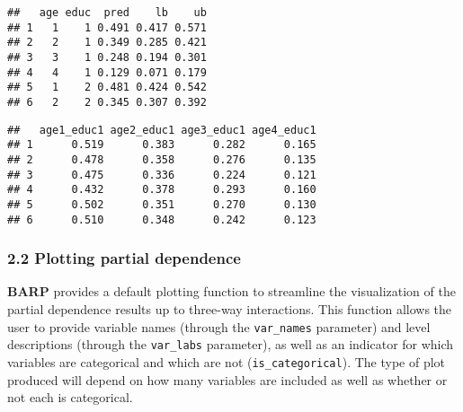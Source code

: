 \documentclass[]{article}
\newenvironment{Shaded}{\begin{snugshade}}{\end{snugshade}}
\newcommand{\KeywordTok}[1]{\textcolor[rgb]{0.13,0.29,0.53}{\textbf{#1}}}
\newcommand{\DecValTok}[1]{\textcolor[rgb]{0.00,0.00,0.81}{#1}}
\newcommand{\StringTok}[1]{\textcolor[rgb]{0.31,0.60,0.02}{#1}}
\newcommand{\OperatorTok}[1]{\textcolor[rgb]{0.81,0.36,0.00}{\textbf{#1}}}
\newcommand{\NormalTok}[1]{#1}
\begin{document}
\begin{Shaded}
\end{Shaded}

\begin{verbatim}
##   age educ  pred    lb    ub
## 1   1    1 0.491 0.417 0.571
## 2   2    1 0.349 0.285 0.421
## 3   3    1 0.248 0.194 0.301
## 4   4    1 0.129 0.071 0.179
## 5   1    2 0.481 0.424 0.542
## 6   2    2 0.345 0.307 0.392
\end{verbatim}

\begin{Shaded}
\end{Shaded}

\begin{verbatim}
##   age1_educ1 age2_educ1 age3_educ1 age4_educ1
## 1      0.519      0.383      0.282      0.165
## 2      0.478      0.358      0.276      0.135
## 3      0.475      0.336      0.224      0.121
## 4      0.432      0.378      0.293      0.160
## 5      0.502      0.351      0.270      0.130
## 6      0.510      0.348      0.242      0.123
\end{verbatim}

\subsubsection{2.2 Plotting partial
dependence}\label{plotting-partial-dependence}

\textbf{BARP} provides a default plotting function to streamline the
visualization of the partial dependence results up to three-way
interactions. This function allows the user to provide variable names
(through the \texttt{var\_names} parameter) and level descriptions
(through the \texttt{var\_labs} parameter), as well as an indicator for
which variables are categorical and which are not
(\texttt{is\_categorical}). The type of plot produced will depend on how
many variables are included as well as whether or not each is
categorical.
\end{document}
